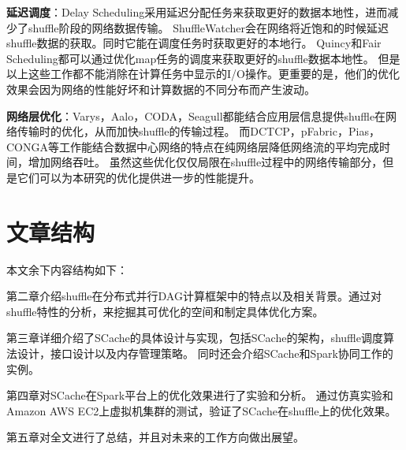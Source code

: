 \textbf{延迟调度}：Delay Scheduling\cite{delay}采用延迟分配任务来获取更好的数据本地性，进而减少了shuffle阶段的网络数据传输。
ShuffleWatcher\cite{shufflewatcher}会在网络将近饱和的时候延迟shuffle数据的获取。同时它能在调度任务时获取更好的本地行。
Quincy\cite{quincy}和Fair Scheduling\cite{preemptive}都可以通过优化map任务的调度来获取更好的shuffle数据本地性。
但是以上这些工作都不能消除在计算任务中显示的I/O操作。更重要的是，他们的优化效果会因为网络的性能好坏和计算数据的不同分布而产生波动。

\textbf{网络层优化}：Varys\cite{varys}，Aalo\cite{aalo}，CODA\cite{coda}，Seagull\cite{seagull}都能结合应用层信息提供shuffle在网络传输时的优化，从而加快shuffle的传输过程。
而DCTCP\cite{dctcp}，pFabric\cite{pfabric}，Pias\cite{pias}，CONGA\cite{conga}等工作能结合数据中心网络的特点在纯网络层降低网络流的平均完成时间，增加网络吞吐。
虽然这些优化仅仅局限在shuffle过程中的网络传输部分，但是它们可以为本研究的优化提供进一步的性能提升。

\section{文章结构}

本文余下内容结构如下：

第二章介绍shuffle在分布式并行DAG计算框架中的特点以及相关背景。通过对shuffle特性的分析，来挖掘其可优化的空间和制定具体优化方案。

第三章详细介绍了SCache的具体设计与实现，包括SCache的架构，shuffle调度算法设计，接口设计以及内存管理策略。
同时还会介绍SCache和Spark协同工作的实例。

第四章对SCache在Spark平台上的优化效果进行了实验和分析。
通过仿真实验和Amazon AWS EC2上虚拟机集群的测试，验证了SCache在shuffle上的优化效果。

第五章对全文进行了总结，并且对未来的工作方向做出展望。







